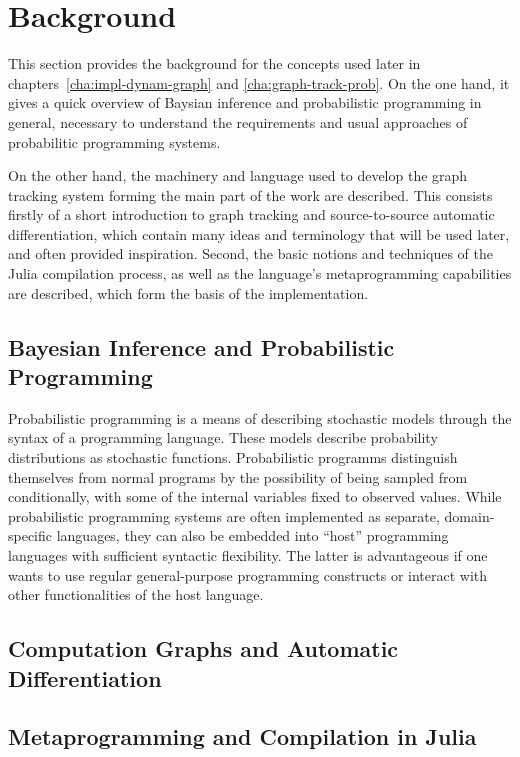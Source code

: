 \chapter{Background}
\label{cha:background}

This section provides the background for the concepts used later in
chapters~\ref{cha:impl-dynam-graph} and \ref{cha:graph-track-prob}.  On the one hand, it gives a
quick overview of Baysian inference and probabilistic programming in general, necessary to
understand the requirements and usual approaches of probabilitic programming systems.

On the other hand, the machinery and language used to develop the graph tracking system forming the
main part of the work are described.  This consists firstly of a short introduction to graph
tracking and source-to-source automatic differentiation, which contain many ideas and terminology
that will be used later, and often provided inspiration.  Second, the basic notions and techniques
of the Julia compilation process, as well as the language's metaprogramming capabilities are
described, which form the basis of the implementation.


\section{Bayesian Inference and Probabilistic Programming}
\label{sec:bayes-infer-prob}

Probabilistic programming is a means of describing stochastic models through the syntax of a
programming language.  These models describe probability distributions as stochastic functions.
Probabilistic programms distinguish themselves from normal programs by the possibility of being
sampled from conditionally, with some of the internal variables fixed to observed values.  While
probabilistic programming systems are often implemented as separate, domain-specific languages, they
can also be embedded into \enquote{host} programming languages with sufficient syntactic
flexibility.  The latter is advantageous if one wants to use regular general-purpose programming
constructs or interact with other functionalities of the host language.


\section{Computation Graphs and Automatic Differentiation}
\label{sec:graph-track-autom}


\section{Metaprogramming and Compilation in Julia}
\label{sec:metapr-comp-julia}




